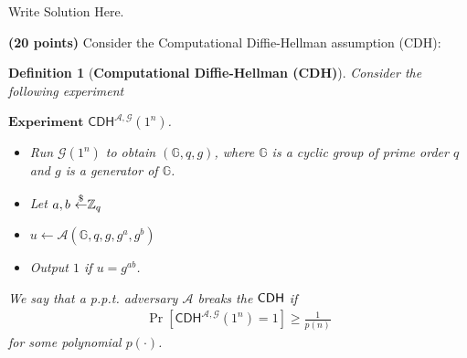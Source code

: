 \documentclass[12pt]{hw}
\newtheorem{definition}{Definition}
\begin{document}
\begin{answer}
  Write Solution Here.
\end{answer}


\begin{exercise}
{\bf (20 points)}
    Consider the Computational Diffie-Hellman assumption (CDH):
\begin{definition}[\bf{Computational Diffie-Hellman (CDH)}]
    Consider the following experiment
    \begin{mdframed}
        $\textbf{Experiment } \mathsf{CDH}^{\mathcal{A}, \mathcal{G}}(1^n)$.
        \begin{itemize}
            \item Run $\mathcal{G}(1^n)$ to obtain $(\mathbb{G}, q, g)$, where $\mathbb{G}$ is a cyclic group of prime order $q$  and $g$ is a generator of $\mathbb{G}$.
            \item Let $a, b\ {\overset{\$}{\leftarrow}} \mathbb{Z}_q$
            \item $u \gets \mathcal{A}(\mathbb{G}, q, g, g^a, g^b)$
            \item Output $1$ if $u = g^{ab}$.
        \end{itemize}
        \end{mdframed}
    We say that a p.p.t. adversary $\mathcal{A}$ breaks the $\sf{CDH}$ if
    \begin{align*}
        \Pr[\mathsf{CDH}^{\mathcal{A}, \mathcal{G}}(1^n)=1] \geq \frac{1}{p(n)}
    \end{align*}
    for some polynomial $p(\cdot)$.
\end{definition}



\end{exercise}
\end{document}
